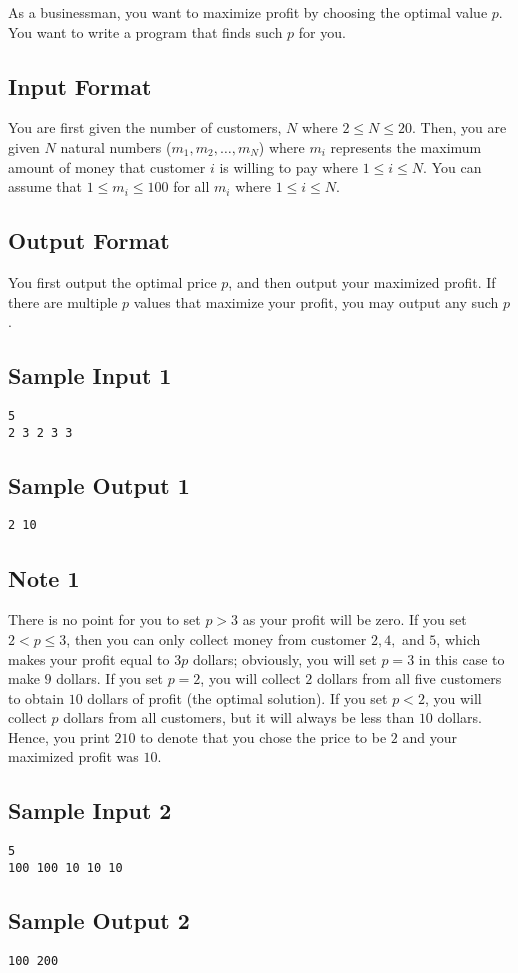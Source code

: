 As a businessman, you want to maximize profit by choosing the optimal value $p$.  You want to write a program that finds such $p$ for you. 

\subsection*{Input Format}
You are first given the number of customers, $N$ where $2 \leq N \leq 20$. Then, you are given $N$ natural numbers ($m_1, m_2, \dots, m_N$) where $m_i$ represents the maximum amount of money that customer $i$ is willing to pay where $1 \leq i \leq N$. You can assume that $1 \leq m_i \leq 100$ for all $m_i$ where $1 \leq i \leq N$. 

\subsection*{Output Format}
You first output the optimal price $p$, and then output your maximized profit. If there are multiple $p$ values that maximize your profit, you may output any such $p$. 

\subsection*{Sample Input 1}
\begin{verbatim}
5
2 3 2 3 3
\end{verbatim}
\subsection*{Sample Output 1}
\begin{verbatim}
2 10
\end{verbatim}

\subsection*{Note 1}
There is no point for you to set $p > 3$ as your profit will be zero. If you set $2 < p \leq 3$, then you can only collect money from customer $2, 4,$ and $5$, which makes your profit equal to $3p$ dollars; obviously, you will set $p = 3$ in this case to make $9$ dollars. 
If you set $p = 2$, you will collect $2$ dollars from all five customers to obtain $10$ dollars of profit (the optimal solution).
If you set $p < 2$, you will collect $p$ dollars from all customers, but it will always be less than $10$ dollars. 
Hence, you print $2 10$ to denote that you chose the price to be $2$ and your maximized profit was $10$. 

\subsection*{Sample Input 2}
\begin{verbatim}
5
100 100 10 10 10
\end{verbatim}
\subsection*{Sample Output 2}
\begin{verbatim}
100 200
\end{verbatim}


